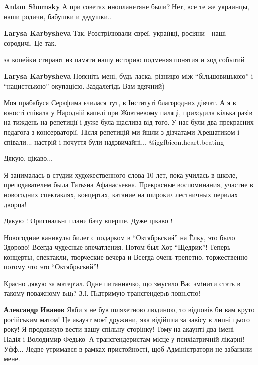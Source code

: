 \begin{itemize}
\begin{itemize}
\textbf{Anton Shumsky} А при советах инопланетяне были? Нет, все те же украинцы, наши родичи, бабушки и дедушки..

\textbf{Larysa Karbysheva} Так. Розстрілювали євреї, українці, росіяни - наші сородичі. Це так.

за копейки стирают из памяти нашу историю подменяя понятия и ход событий

\textbf{Larysa Karbysheva} Поясніть мені, будь ласка, різницю між \enquote{більшовицькою} і \enquote{нацистською} окупацією. Заздалегідь Вам вдячний)
\end{itemize} %


Моя прабабуся Серафима вчилася тут, в Інституті благородних дівчат. А я в
юності співала у Народній капелі при Жовтневому палаці, приходила кілька разів
на тиждень на репетиції і дуже була щаслива від того. У нас були два прекрасних
педагога з консерваторії. Після репетицій ми йшли з дівчатами Хрещатиком і
співали... настрій і почуття були надзвичайні... @igg{fbicon.heart.beating} 


Дякую, цікаво...


Я занималась в студии художественного слова 10 лет, пока училась в школе,
преподавателем была Татьяна Афанасьевна. Прекрасные воспоминания, участие в
новогодних спектаклях, концертах, катание на широких лестничных перилах дворца!


Дякую ! Оригінальні плани бачу вперше. Дуже цікаво !


Новогодние каникулы билет с подарком в \enquote{Октябрьский} на Ёлку, это было Здорово!
Всегда чудесные впечатления. Потом был Хор \enquote{Щедрик}! Теперь
концерты, спектакли, творческие вечера и Всегда очень трепетно, торжественно
потому что это \enquote{Октябрьский}!



Красно дякую за матерiал. Одне питаннячко, що змусило Вас змiнити стать в
такому поважному вiцi? З.I. Пiдтримую трансгендерiв повнiстю!

\begin{itemize} %
\textbf{Александр Иванов} Якби я не був шляхетною людиною, то відповів би вам круто російським матом!
Це акаунт моєї дружини, яка відійшла за завісу в липні цього року! Я продовжую вести нашу спільну сторінку! Тому на акаунті два імені - Надія і Володимир Федько.
А трансгендеристам місце у психіатричній лікарні!
Уфф... Ледве утримався в рамках пристойності, щоб Адміністратори не забанили мене.


\end{itemize}
\end{itemize}
